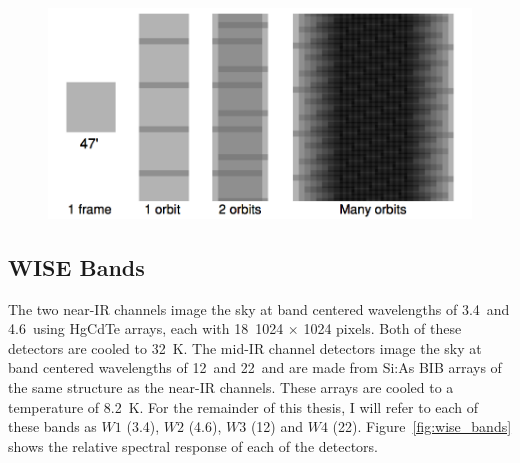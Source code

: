     \begin{figure}
    \centering
    \includegraphics[width=\textwidth]{Ch2/wise_scan_plan}
    \caption[]{}
    \label{fig:wise_scan_plan}
    \end{figure}
    
    
   
   
    \subsection{WISE Bands}\label{sec:wise_bands}
   
   
   The two near-IR channels image the sky at band centered wavelengths of 3.4\micron\ and 4.6\micron\ using HgCdTe arrays, each with 18\micron\ 1024 $\times$ 1024 pixels. Both of these detectors are cooled to 32~K. The mid-IR channel detectors image the sky at band centered wavelengths of 12\micron\ and 22\micron\ and are made from Si:As BIB arrays of the same structure as the near-IR channels. These arrays are cooled to a temperature of 8.2~K. For the remainder of this thesis, I will refer to each of these bands as $W1$ (3.4\micron), $W2$ (4.6\micron), $W3$ (12\micron) and $W4$ (22\micron). Figure~\ref{fig:wise_bands} shows the relative spectral response of each of the detectors. 
   

